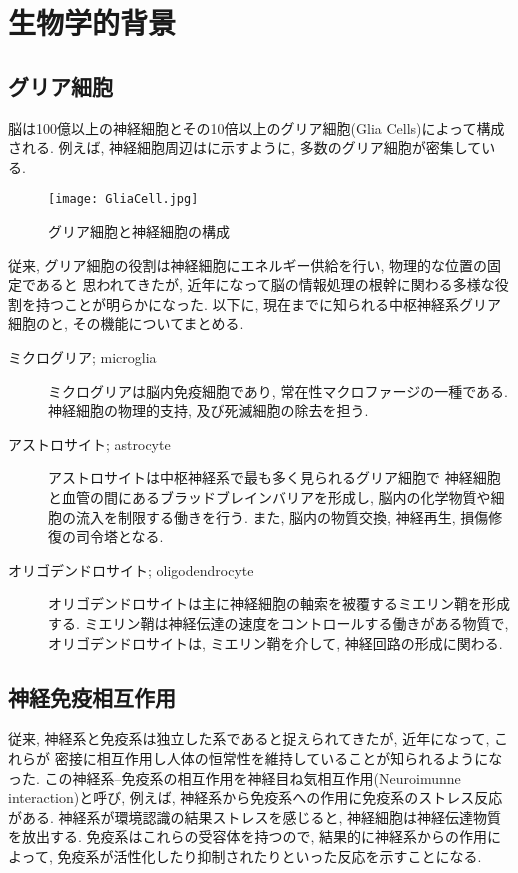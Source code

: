 \chapter{生物学的背景}
\section{グリア細胞}
脳は100億以上の神経細胞とその10倍以上のグリア細胞(Glia Cells)によって構成される.
例えば, 神経細胞周辺はに示すように, 多数のグリア細胞が密集している.
\begin{figure}[H]
\centering
\texttt{[image: GliaCell.jpg]}
\caption{グリア細胞と神経細胞の構成\cite{GliaCell}}  
\label{GliaCell}
\end{figure}
従来, グリア細胞の役割は神経細胞にエネルギー供給を行い, 物理的な位置の固定であると
思われてきたが, 近年になって脳の情報処理の根幹に関わる多様な役割を持つことが明らかになった.
以下に, 現在までに知られる中枢神経系グリア細胞のと, その機能についてまとめる.
\begin{description}
  \item[ミクログリア; microglia] 
  ミクログリアは脳内免疫細胞であり, 常在性マクロファージの一種である.
  神経細胞の物理的支持, 及び死滅細胞の除去を担う.
  \item[アストロサイト; astrocyte]
  アストロサイトは中枢神経系で最も多く見られるグリア細胞で
  神経細胞と血管の間にあるブラッドブレインバリアを形成し, 
  脳内の化学物質や細胞の流入を制限する働きを行う.
  また, 脳内の物質交換, 神経再生, 損傷修復の司令塔となる.
  \item[オリゴデンドロサイト; oligodendrocyte]   
  オリゴデンドロサイトは主に神経細胞の軸索を被覆するミエリン鞘を形成する.
  ミエリン鞘は神経伝達の速度をコントロールする働きがある物質で, 
  オリゴデンドロサイトは, ミエリン鞘を介して, 神経回路の形成に関わる.
\end{description}
\section{神経免疫相互作用}
従来, 神経系と免疫系は独立した系であると捉えられてきたが, 近年になって, これらが
密接に相互作用し人体の恒常性を維持していることが知られるようになった.
この神経系--免疫系の相互作用を神経目ね気相互作用(Neuroimunne interaction)と呼び, 
例えば, 神経系から免疫系への作用に免疫系のストレス反応がある. 
神経系が環境認識の結果ストレスを感じると, 神経細胞は神経伝達物質を放出する.
免疫系はこれらの受容体を持つので, 結果的に神経系からの作用によって, 
免疫系が活性化したり抑制されたりといった反応を示すことになる.

